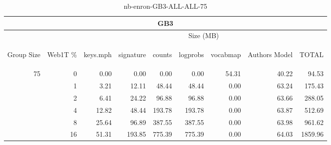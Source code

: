 \begin{center}
\begin{table}[htbp]
\begin{tabular}{ | r | r | r | r | r | r | r | r | r |}
\hline
\multicolumn{9}{|c|}{GB3}\\
\hline
 & & \multicolumn{7}{|c|}{Size (MB)}\\ \cline{3-9}
\begin{sideways}Group Size\end{sideways} & \begin{sideways}Web1T \% \end{sideways} & \begin{sideways}keys.mph\end{sideways} & \begin{sideways}signature\end{sideways} & \begin{sideways}counts\end{sideways} & \begin{sideways}logprobs\end{sideways} & \begin{sideways}vocabmap\end{sideways} & \begin{sideways}Authors Model \end{sideways} & \begin{sideways}TOTAL\end{sideways}\\
\hline
\multirow{5}{*}{75}
 & 0 & 0.00 & 0.00 & 0.00 & 0.00 & 54.31 & 40.22 & 94.53\\ \cline{2-9}
 & 1 & 3.21 & 12.11 & 48.44 & 48.44 & 0.00 & 63.24 & 175.43\\ \cline{2-9}
 & 2 & 6.41 & 24.22 & 96.88 & 96.88 & 0.00 & 63.66 & 288.05\\ \cline{2-9}
 & 4 & 12.82 & 48.44 & 193.78 & 193.78 & 0.00 & 63.87 & 512.69\\ \cline{2-9}
 & 8 & 25.64 & 96.89 & 387.55 & 387.55 & 0.00 & 63.98 & 961.62\\ \cline{2-9}
 & 16 & 51.31 & 193.85 & 775.39 & 775.39 & 0.00 & 64.03 & 1859.96\\ \cline{2-9}
\hline
\end{tabular}
\caption{nb-enron-GB3-ALL-ALL-75}
\label{table:nb-enron-GB3-ALL-ALL-75}
\end{table}
\end{center}

